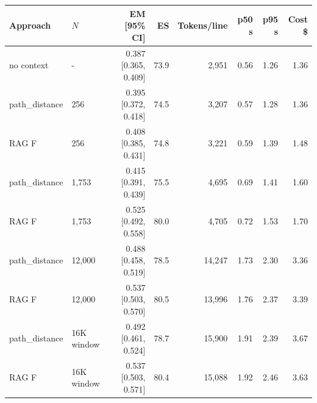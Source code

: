 \begin{tabular}{llrrrrrr}
\toprule
Approach & $N$ & EM [95\% CI] & ES & Tokens/line & p50 s & p95 s & Cost \$ \\
\midrule
no context & - & 0.387 [0.365, 0.409] & 73.9 & 2,951 & 0.56 & 1.26 & 1.36 \\
path\_distance & 256 & 0.395 [0.372, 0.418] & 74.5 & 3,207 & 0.57 & 1.28 & 1.36 \\
RAG F & 256 & 0.408 [0.385, 0.431] & 74.8 & 3,221 & 0.59 & 1.39 & 1.48 \\
path\_distance & 1,753 & 0.415 [0.391, 0.439] & 75.5 & 4,695 & 0.69 & 1.41 & 1.60 \\
RAG F & 1,753 & 0.525 [0.492, 0.558] & 80.0 & 4,705 & 0.72 & 1.53 & 1.70 \\
path\_distance & 12,000 & 0.488 [0.458, 0.519] & 78.5 & 14,247 & 1.73 & 2.30 & 3.36 \\
RAG F & 12,000 & 0.537 [0.503, 0.570] & 80.5 & 13,996 & 1.76 & 2.37 & 3.39 \\
path\_distance & 16K window & 0.492 [0.461, 0.524] & 78.7 & 15,900 & 1.91 & 2.39 & 3.67 \\
RAG F & 16K window & 0.537 [0.503, 0.571] & 80.4 & 15,088 & 1.92 & 2.46 & 3.63 \\
\bottomrule
\end{tabular}
